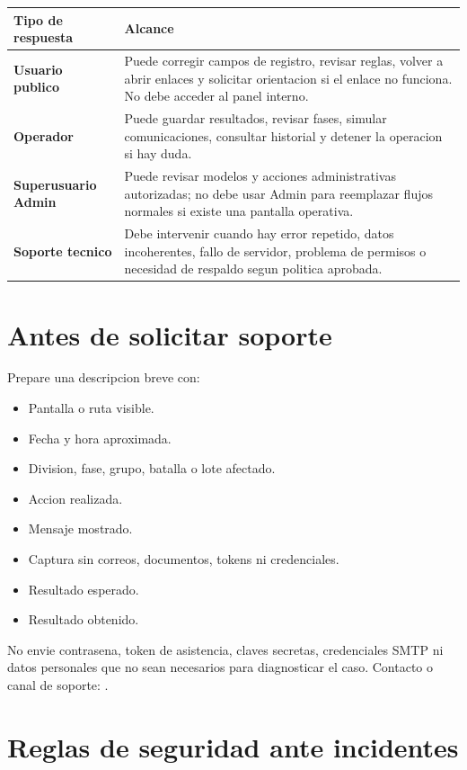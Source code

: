 \begin{tabularx}{\linewidth}{>{\bfseries}p{3.2cm}X}
\toprule
Tipo de respuesta & Alcance\\
\midrule
Usuario publico & Puede corregir campos de registro, revisar reglas, volver a abrir enlaces y solicitar orientacion si el enlace no funciona. No debe acceder al panel interno.\\
Operador & Puede guardar resultados, revisar fases, simular comunicaciones, consultar historial y detener la operacion si hay duda.\\
Superusuario Admin & Puede revisar modelos y acciones administrativas autorizadas; no debe usar Admin para reemplazar flujos normales si existe una pantalla operativa.\\
Soporte tecnico & Debe intervenir cuando hay error repetido, datos incoherentes, fallo de servidor, problema de permisos o necesidad de respaldo segun politica aprobada.\\
\bottomrule
\end{tabularx}

\section{Antes de solicitar soporte}

Prepare una descripcion breve con:
\begin{itemize}
    \item Pantalla o ruta visible.
    \item Fecha y hora aproximada.
    \item Division, fase, grupo, batalla o lote afectado.
    \item Accion realizada.
    \item Mensaje mostrado.
    \item Captura sin correos, documentos, tokens ni credenciales.
    \item Resultado esperado.
    \item Resultado obtenido.
\end{itemize}

No envie contrasena, token de asistencia, claves secretas, credenciales SMTP ni datos personales que no sean necesarios para diagnosticar el caso. Contacto o canal de soporte: .

\section{Reglas de seguridad ante incidentes}


